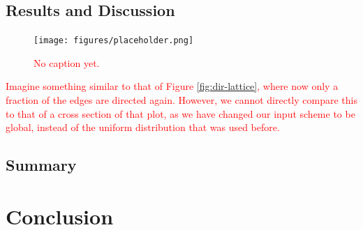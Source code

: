 \subsection{Results and Discussion}

\begin{figure}
  \centering
  \texttt{[image: figures/placeholder.png]}
  \caption{
    \textcolor{red}{
      No caption yet.
    }
  }
  \label{fig:undirection-performance}
\end{figure}

\textcolor{red}{
  Imagine something similar to that of Figure \ref{fig:dir-lattice}, where now
only a fraction of the edges are directed again. However, we cannot directly
compare this to that of a cross section of that plot, as we have changed our
input scheme to be global, instead of the uniform distribution that was used
before.
}

\subsection{Summary}

\section{Conclusion}


